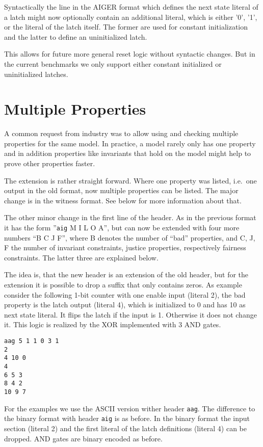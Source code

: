 \documentclass{llncs}
\begin{document}
Syntactically the line in the AIGER format which defines the next state
literal of a latch might now optionally contain an additional literal, which
is either '0', '1', or the literal of the latch itself.  The former are used
for constant initialization and the latter to define an uninitialized latch.

This allows for future more general reset logic without syntactic changes.
But in the current benchmarks we only support either constant initialized or
uninitialized latches.

\section{Multiple Properties}

A common request from industry was to allow using and checking multiple
properties for the same model.  In practice, a model rarely only has one
property and in addition properties like invariants that hold on the model
might help to prove other properties faster.

The extension is rather straight forward.  Where one property was listed,
i.e.~one output in the old format, now multiple properties can be listed.
The major change is in the witness format.  See below for more information
about that.

The other minor change in the first line of the header.  As in the previous
format it has the form ''\texttt{aig} M I L O A'', but can now be
extended with four more numbers ``B C J F'', where B denotes the
number of ``bad'' properties, and C, J, F the number of
invariant constraints, justice properties, respectively fairness
constraints.  The latter three are explained below.

The idea is, that the new header is an extension of the old header,
but for the extension it is possible to drop a suffix that only contains
zeros.  As example consider the following 1-bit counter with one enable
input (literal 2),  the bad property is the latch output (literal 4), which
is initialized to 0 and has 10 as next state literal.  It flips the latch if
the input is 1.  Otherwise it does not change it.  This logic is realized by
the XOR implemented with 3 AND gates.
{\small
\begin{verbatim}
aag 5 1 1 0 3 1
2
4 10 0
4
6 5 3
8 4 2
10 9 7
\end{verbatim}}
For the examples we use the ASCII
version wither header \texttt{aag}.  The difference to the binary format
with header \texttt{aig} is as before.  In the binary format
the input section (literal 2) and the first literal of the latch definitions
(literal 4) can be dropped.  AND gates are binary encoded as before.
\end{document}
